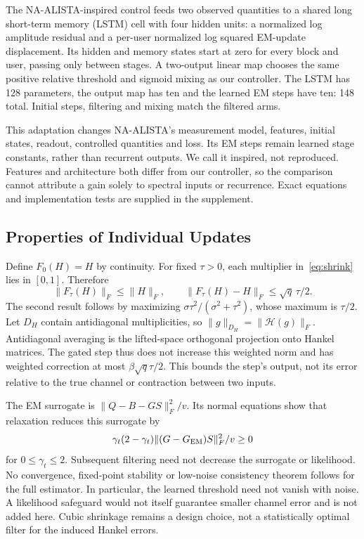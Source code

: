 \documentclass[10pt,journal,letterpaper]{IEEEtran}
\newcommand{\HH}{\mathcal{H}}
\begin{document}
The NA-ALISTA-inspired control feeds two observed quantities to a shared long short-term memory (LSTM) cell with four hidden units: a normalized log amplitude residual and a per-user normalized log squared EM-update displacement. Its hidden and memory states start at zero for every block and user, passing only between stages. A two-output linear map chooses the same positive relative threshold and sigmoid mixing as our controller. The LSTM has 128 parameters, the output map has ten and the learned EM steps have ten: 148 total. Initial steps, filtering and mixing match the filtered arms.

This adaptation changes NA-ALISTA's measurement model, features, initial states, readout, controlled quantities and loss. Its EM steps remain learned stage constants, rather than recurrent outputs. We call it inspired, not reproduced. Features and architecture both differ from our controller, so the comparison cannot attribute a gain solely to spectral inputs or recurrence. Exact equations and implementation tests are supplied in the supplement.

\subsection{Properties of Individual Updates}
Define $F_0(H)=H$ by continuity. For fixed $\tau>0$, each multiplier in~\eqref{eq:shrink} lies in $[0,1]$. Therefore
\begin{equation}
 \|F_\tau(H)\|_F\le\|H\|_F,\qquad
 \|F_\tau(H)-H\|_F\le\sqrt q\,\tau/2.
 \label{eq:bound}
\end{equation}
The second result follows by maximizing $\sigma\tau^2/(\sigma^2+\tau^2)$, whose maximum is $\tau/2$. Let $D_H$ contain antidiagonal multiplicities, so $\|g\|_{D_H}=\|\HH(g)\|_F$. Antidiagonal averaging is the lifted-space orthogonal projection onto Hankel matrices. The gated step thus does not increase this weighted norm and has weighted correction at most $\beta\sqrt q\tau/2$. This bounds the step's output, not its error relative to the true channel or contraction between two inputs.

The EM surrogate is $\|Q-B-GS\|_F^2/v$. Its normal equations show that relaxation reduces this surrogate by
\begin{equation}
 \gamma_t(2-\gamma_t)\|(G-G_{\rm EM})S\|_F^2/v\ge0
\end{equation}
for $0\le\gamma_t\le2$. Subsequent filtering need not decrease the surrogate or likelihood. No convergence, fixed-point stability or low-noise consistency theorem follows for the full estimator. In particular, the learned threshold need not vanish with noise. A likelihood safeguard would not itself guarantee smaller channel error and is not added here. Cubic shrinkage remains a design choice, not a statistically optimal filter for the induced Hankel errors.
\end{document}
